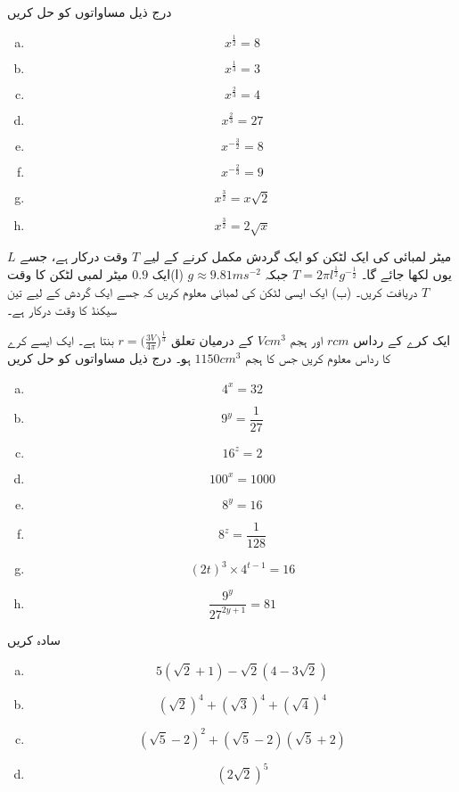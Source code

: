 درج ذیل مساواتوں کو حل کریں
\begin{multicols}{4}
\begin{enumerate}[a.]
\item
\[x^{\frac{1}{2}}=8\]
\item
\[x^{\frac{1}{3}}=3\]
\item
\[x^{\frac{2}{3}}=4\]
\item
\[x^{\frac{2}{3}}=27\]
\item
\[x^{-\frac{3}{2}}=8\]
\item
\[x^{-\frac{2}{3}}=9\]
\item
\[x^{\frac{3}{2}}=x\sqrt{2}\]
\item
\[x^{\frac{3}{2}}=2\sqrt{x}\]
\end{enumerate}
\end{multicols}
\(L\)
میٹر لمبائی کی ایک لٹکن کو ایک گردش مکمل کرنے کے لیے 
\(T\) وقت درکار ہے، جسے یوں لکھا جائے گا۔
\(T=2\pi l^{\frac{1}{2}}g^{-\frac{1}{2}}\)
 جبکہ
\(g\approx 9.81 ms^{-2}\)
(ا)ایک
 \(0.9\) 
میٹر لمبی لٹکن کا وقت
 \(T\) 
دریافت کریں۔
(ب) ایک ایسی لٹکن کی لمبائی معلوم کریں کہ جسے ایک گردش کے لیے تین سیکنڈ کا وقت درکار ہے۔

ایک کرے کے رداس 
\(r cm\) اور ہجم \(V cm^{3}\) کے درمیان تعلق
\(r=\big(\frac{3V}{4\pi}\big)^{\frac{1}{3}}\)
بنتا ہے۔ ایک ایسے کرے کا رداس معلوم کریں جس کا ہجم
 \(1150cm^{3}\) ہو۔
درج ذیل مساواتوں کو حل کریں
\begin{multicols}{4}
\begin{enumerate}[a.]
\item
\[4^{x}=32\]
\item
\[9^{y}=\frac{1}{27}\]
\item
\[16^{z}=2\]
\item
\[100^{x}=1000\]
\item
\[8^{y}=16\]
\item
\[8^{z}=\frac{1}{128}\]
\item
\[(2t)^{3}\times 4^{t-1}=16\]
\item
\[\frac{9^{y}}{27^{2y+1}}=81\]
\end{enumerate}
\end{multicols}

سادہ کریں
\begin{multicols}{4}
\begin{enumerate}[a.]
\item
\[5(\sqrt{2}+1)-\sqrt{2}(4-3\sqrt{2})\]
\item
\[(\sqrt{2})^{4}+(\sqrt{3})^{4}+(\sqrt{4})^{4}\]
\item
\[(\sqrt{5}-2)^{2}+(\sqrt{5}-2)(\sqrt{5}+2)\]
\item
\[(2\sqrt{2})^{5}\]
\end{enumerate}
\end{multicols}

